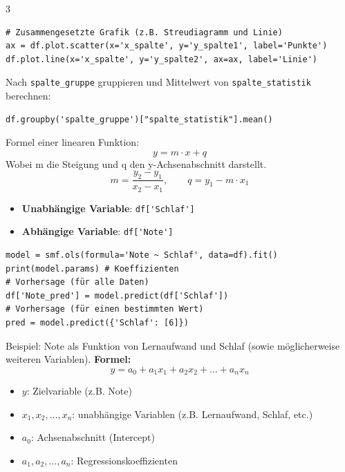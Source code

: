\begin{landscape}
\begin{multicols*}{3}
\begin{cheatSheetBox}[title=Grafiken erstellen]
\begin{lstlisting}
# Zusammengesetzte Grafik (z.B. Streudiagramm und Linie)
ax = df.plot.scatter(x='x_spalte', y='y_spalte1', label='Punkte')
df.plot.line(x='x_spalte', y='y_spalte2', ax=ax, label='Linie')
\end{lstlisting}
    \end{cheatSheetBox}

    \begin{cheatSheetBox}[title=Gruppieren]
      Nach \texttt{spalte\_gruppe} gruppieren und Mittelwert von \texttt{spalte\_statistik} berechnen:
      \begin{lstlisting}
df.groupby('spalte_gruppe')["spalte_statistik"].mean()
\end{lstlisting}
    \end{cheatSheetBox}
    \columnbreak

    \begin{cheatSheetBox}[title=Lineare Funktion]
      Formel einer linearen Funktion:
      \[y = m \cdot x + q\]
      Wobei m die Steigung und q den y-Achsenabschnitt darstellt.
      \[m=\frac{y_2 - y_1}{x_2 - x_1},\quad\quad q = y_1 - m \cdot x_1\]
    \end{cheatSheetBox}
    \begin{cheatSheetBox}[title=Lineare Regression]
      \begin{itemize}
        \item \textbf{Unabhängige Variable}: \lstinline|df['Schlaf']|
        \item \textbf{Abhängige Variable}: \lstinline|df['Note']|
      \end{itemize}
      \begin{lstlisting}
model = smf.ols(formula='Note ~ Schlaf', data=df).fit()
print(model.params) # Koeffizienten
# Vorhersage (für alle Daten)
df['Note_pred'] = model.predict(df['Schlaf']) 
# Vorhersage (für einen bestimmten Wert)
pred = model.predict({'Schlaf': [6]})
\end{lstlisting}
    \end{cheatSheetBox}

    \begin{cheatSheetBox}[title=Multiple lineare Regression]
      Beispiel: Note als Funktion von Lernaufwand und Schlaf (sowie möglicherweise weiteren Variablen).
      \textbf{Formel:}
      \[
        y = a_0 + a_1 x_1 + a_2 x_2 + \ldots + a_n x_n
      \]
      \begin{itemize}
        \item $y$: Zielvariable (z.B. Note)
        \item $x_1, x_2, \ldots, x_n$: unabhängige Variablen (z.B. Lernaufwand, Schlaf, etc.)
        \item $a_0$: Achsenabschnitt (Intercept)
        \item $a_1, a_2, \ldots, a_n$: Regressionskoeffizienten
      \end{itemize}
    \end{cheatSheetBox}


\end{multicols*}
\end{landscape}
